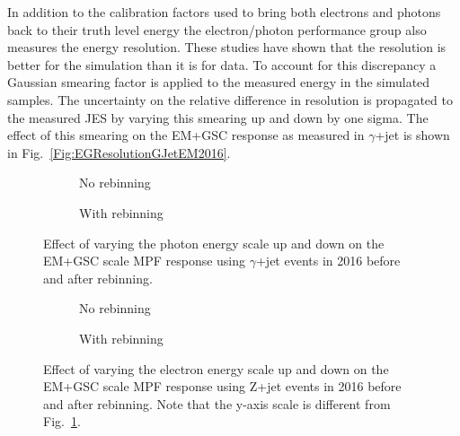 In addition to the calibration factors used to bring both electrons and photons back to their truth level energy the electron/photon performance group also measures the energy resolution.  
These studies have shown that the resolution is better for the simulation than it is for data.  
To account for this discrepancy a Gaussian smearing factor is applied to the measured energy in the simulated samples.  
The uncertainty on the relative difference in resolution is propagated to the measured JES by varying this smearing up and down by one sigma.  
The effect of this smearing on the EM+GSC response as measured in $\gamma$+jet is shown in Fig.~\ref{Fig:EGResolutionGJetEM2016}.  

\begin{figure}[!ht]
\centering
\begin{subfigure}{.5\textwidth}
\centering
{}
\caption{No rebinning}
\end{subfigure}%
\begin{subfigure}{.5\textwidth}  \centering
{}
\caption{With rebinning}
\end{subfigure}
\caption{Effect of varying the photon energy scale up and down on the EM+GSC scale MPF response using $\gamma$+jet events in 2016 before and after rebinning. }
\label{Fig:EGScaleGJetEM2016}
\end{figure}

\begin{figure}[!ht]
\centering
\begin{subfigure}{.5\textwidth}
\centering
{}
\caption{No rebinning}
\end{subfigure}%
\begin{subfigure}{.5\textwidth}  \centering
{}
\caption{With rebinning}
\end{subfigure}
\caption{Effect of varying the electron energy scale up and down on the EM+GSC scale MPF response using Z+jet events in 2016 before and after rebinning.  Note that the y-axis scale is different from Fig.~\ref{Fig:EGScaleGJetEM2016}. } 
\label{Fig:EGScaleZJetEM2016}
\end{figure}


